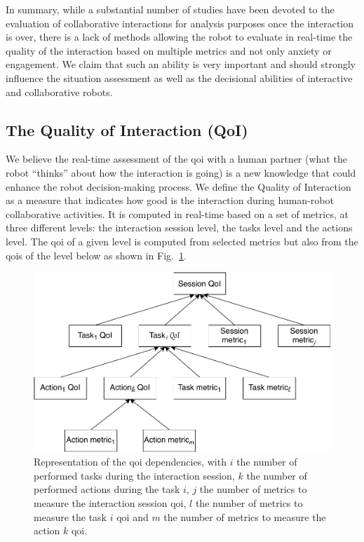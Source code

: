 \documentclass[a4paper,11pt,twoside]{StyleThese}
\begin{document}
In summary, while a substantial number of studies have been devoted to the evaluation of collaborative interactions for analysis purposes once the interaction is over, there is a lack of methods allowing the robot to evaluate in real-time the quality of the interaction based on multiple metrics and not only anxiety or engagement. We claim that such an ability is very important and should strongly influence the situation assessment as well as the decisional abilities of interactive and collaborative robots. 




\subsection{The Quality of Interaction (QoI)}\label{sec:eval}

We believe the real-time assessment of the \acrshort{qoi} with a human partner (\ie what the robot ``thinks'' about how the interaction is going) is a new knowledge that could enhance the robot decision-making process. We define the Quality of Interaction as a measure that indicates how good is the interaction during human-robot collaborative activities. It is computed in real-time based on a set of metrics, at three different levels: the interaction session level, the tasks level and the actions level. The \acrshort{qoi} of a given level is computed from selected metrics but also from the \acrshort{qoi}s of the level below as shown in Fig.~\ref{fig:qoi_schema}.

\begin{figure}[!ht]
	\centering
	\includegraphics[width=\linewidth]{figures/chapter2/QoI_schema.pdf}
	\caption{Representation of the \acrshort{qoi} dependencies, with $i$ the number of performed tasks during the interaction session, $k$ the number of performed actions during the task $i$, $j$ the number of metrics to measure the interaction session \acrshort{qoi}, $l$ the number of metrics to measure the task $i$ \acrshort{qoi} and $m$ the number of metrics to measure the action $k$ \acrshort{qoi}.}
	\label{fig:qoi_schema}
\end{figure}
\end{document}
